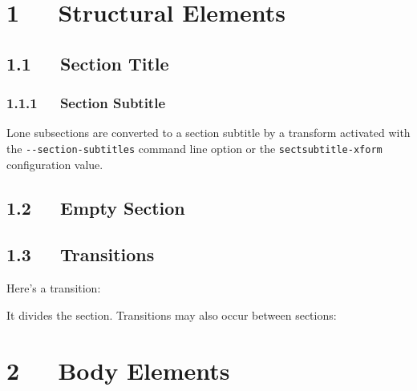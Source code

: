 \documentclass[a4paper]{memoir}
\providecommand*{\DUtransition}{%
  \hspace*{\fill}\hrulefill\hspace*{\fill}
  \vskip 0.5\baselineskip
}
\begin{document}


\pagebreak[4] %

\label{table-of-contents}
\renewcommand{\contentsname}{Table of Contents}
\tableofcontents


\chapter{1   Structural Elements}


\section{1.1   Section Title%
  \label{section-title}%
}


\subsection{1.1.1   Section Subtitle}

Lone subsections are converted to a section subtitle by a transform
activated with the \texttt{-{}-section-subtitles} command line option or the
\texttt{sectsubtitle-xform} configuration value.


\section{1.2   Empty Section}


\section{1.3   Transitions}

Here's a transition:

\DUtransition

It divides the section.  Transitions may also occur between sections:

\DUtransition


\chapter{2   Body Elements%
  \label{body-elements}%
}
\end{document}
